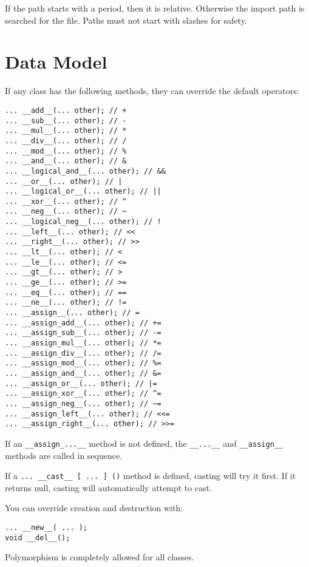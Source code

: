 \documentclass[10pt,a4paper]{article}
\begin{document}
If the path starts with a period, then it is relative. Otherwise the import path is searched for the file. Paths must not start with slashes for safety.

\section{Data Model}
\label{sec:dataModel}

If any class has the following methods, they can override the default operators:
\begin{verbatim}
... __add__(... other); // +
... __sub__(... other); // -
... __mul__(... other); // *
... __div__(... other); // /
... __mod__(... other); // %
... __and__(... other); // &
... __logical_and__(... other); // &&
... __or__(... other); // |
... __logical_or__(... other); // ||
... __xor__(... other); // ^
... __neg__(... other); // ~
... __logical_neg__(... other); // !
... __left__(... other); // <<
... __right__(... other); // >>
... __lt__(... other); // <
... __le__(... other); // <=
... __gt__(... other); // >
... __ge__(... other); // >=
... __eq__(... other); // ==
... __ne__(... other); // !=
... __assign__(... other); // =
... __assign_add__(... other); // +=
... __assign_sub__(... other); // -=
... __assign_mul__(... other); // *=
... __assign_div__(... other); // /=
... __assign_mod__(... other); // %=
... __assign_and__(... other); // &=
... __assign_or__(... other); // |=
... __assign_xor__(... other); // ^=
... __assign_neg__(... other); // ~=
... __assign_left__(... other); // <<=
... __assign_right__(... other); // >>=
\end{verbatim}

If an \verb|__assign_...__| method is not defined, the \verb|__...__| and \verb|__assign__| methods are called in sequence.

If a \verb|... __cast__ [ ... ] ()| method is defined, casting will try it first. If it returns null, casting will automatically attempt to cast.

You can override creation and destruction with:
\begin{verbatim}
... __new__( ... );
void __del__();
\end{verbatim}

Polymorphism is completely allowed for all classes.
\end{document}
